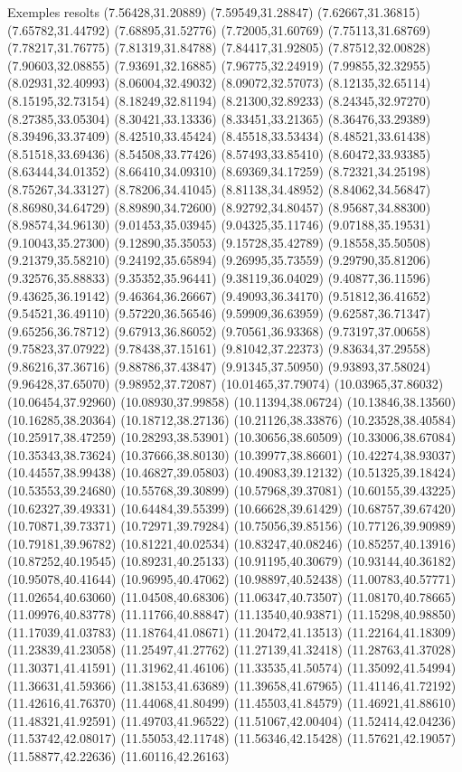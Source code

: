 \documentclass[11pt,a4paper]{article}
\begin{document}
\begin{fmex}{Exemples resolts}
(7.56428,31.20889) (7.59549,31.28847) (7.62667,31.36815) (7.65782,31.44792) (7.68895,31.52776) (7.72005,31.60769) (7.75113,31.68769) (7.78217,31.76775) (7.81319,31.84788) (7.84417,31.92805) (7.87512,32.00828) (7.90603,32.08855) (7.93691,32.16885) (7.96775,32.24919) (7.99855,32.32955) (8.02931,32.40993) (8.06004,32.49032) (8.09072,32.57073) (8.12135,32.65114) (8.15195,32.73154) (8.18249,32.81194) (8.21300,32.89233) (8.24345,32.97270) (8.27385,33.05304) (8.30421,33.13336) (8.33451,33.21365) (8.36476,33.29389) (8.39496,33.37409) (8.42510,33.45424) (8.45518,33.53434) (8.48521,33.61438) (8.51518,33.69436) (8.54508,33.77426) (8.57493,33.85410) (8.60472,33.93385) (8.63444,34.01352) (8.66410,34.09310) (8.69369,34.17259) (8.72321,34.25198) (8.75267,34.33127) (8.78206,34.41045) (8.81138,34.48952) (8.84062,34.56847) (8.86980,34.64729) (8.89890,34.72600) (8.92792,34.80457) (8.95687,34.88300) (8.98574,34.96130) (9.01453,35.03945) (9.04325,35.11746) (9.07188,35.19531) (9.10043,35.27300) (9.12890,35.35053) (9.15728,35.42789) (9.18558,35.50508) (9.21379,35.58210) (9.24192,35.65894) (9.26995,35.73559) (9.29790,35.81206) (9.32576,35.88833) (9.35352,35.96441) (9.38119,36.04029) (9.40877,36.11596) (9.43625,36.19142) (9.46364,36.26667) (9.49093,36.34170) (9.51812,36.41652) (9.54521,36.49110) (9.57220,36.56546) (9.59909,36.63959) (9.62587,36.71347) (9.65256,36.78712) (9.67913,36.86052) (9.70561,36.93368) (9.73197,37.00658) (9.75823,37.07922) (9.78438,37.15161) (9.81042,37.22373) (9.83634,37.29558) (9.86216,37.36716) (9.88786,37.43847) (9.91345,37.50950) (9.93893,37.58024) (9.96428,37.65070) (9.98952,37.72087) (10.01465,37.79074) (10.03965,37.86032) (10.06454,37.92960) (10.08930,37.99858) (10.11394,38.06724) (10.13846,38.13560) (10.16285,38.20364) (10.18712,38.27136) (10.21126,38.33876) (10.23528,38.40584) (10.25917,38.47259) (10.28293,38.53901) (10.30656,38.60509) (10.33006,38.67084) (10.35343,38.73624) (10.37666,38.80130) (10.39977,38.86601) (10.42274,38.93037) (10.44557,38.99438) (10.46827,39.05803) (10.49083,39.12132) (10.51325,39.18424) (10.53553,39.24680) (10.55768,39.30899) (10.57968,39.37081) (10.60155,39.43225) (10.62327,39.49331) (10.64484,39.55399) (10.66628,39.61429) (10.68757,39.67420) (10.70871,39.73371) (10.72971,39.79284) (10.75056,39.85156) (10.77126,39.90989) (10.79181,39.96782) (10.81221,40.02534) (10.83247,40.08246) (10.85257,40.13916) (10.87252,40.19545) (10.89231,40.25133) (10.91195,40.30679) (10.93144,40.36182) (10.95078,40.41644) (10.96995,40.47062) (10.98897,40.52438) (11.00783,40.57771) (11.02654,40.63060) (11.04508,40.68306) (11.06347,40.73507) (11.08170,40.78665) (11.09976,40.83778) (11.11766,40.88847) (11.13540,40.93871) (11.15298,40.98850) (11.17039,41.03783) (11.18764,41.08671) (11.20472,41.13513) (11.22164,41.18309) (11.23839,41.23058) (11.25497,41.27762) (11.27139,41.32418) (11.28763,41.37028) (11.30371,41.41591) (11.31962,41.46106) (11.33535,41.50574) (11.35092,41.54994) (11.36631,41.59366) (11.38153,41.63689) (11.39658,41.67965) (11.41146,41.72192) (11.42616,41.76370) (11.44068,41.80499) (11.45503,41.84579) (11.46921,41.88610) (11.48321,41.92591) (11.49703,41.96522) (11.51067,42.00404) (11.52414,42.04236) (11.53742,42.08017) (11.55053,42.11748) (11.56346,42.15428) (11.57621,42.19057) (11.58877,42.22636) (11.60116,42.26163) 
\end{fmex}
\end{document}
